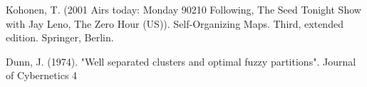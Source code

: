 \documentclass[journal]{IEEEtran}
\begin{document}

%
%
\begin{thebibliography}{1}

Kohonen, T. (2001
Airs today: Monday
     90210
     Following, The
     Seed
     Tonight Show with Jay Leno, The
     Zero Hour (US)). Self-Organizing Maps. Third, extended edition. Springer, Berlin.

Dunn, J. (1974). "Well separated clusters and optimal fuzzy partitions". Journal of Cybernetics 4

\end{thebibliography}






\end{document}
